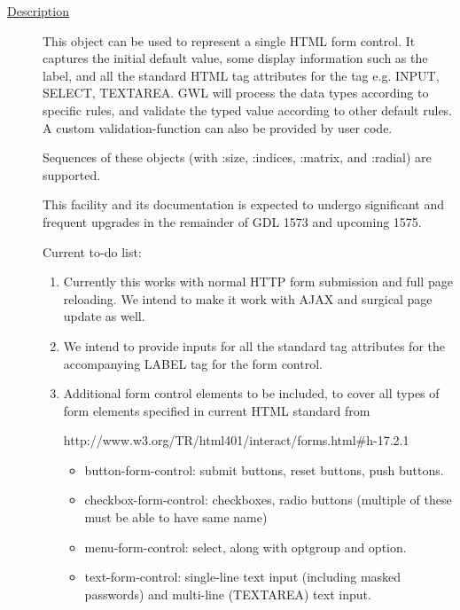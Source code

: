 \documentclass [11pt]{book}
\begin{document}
\begin{itemize}
\begin{description}
\item [
\underline{Description}]


This object can be used to represent a single HTML form control. It captures the 
initial default value, some display information such as the label, and all the standard HTML tag attributes
for the tag e.g. INPUT, SELECT, TEXTAREA. GWL will process the data types according to specific rules,
and validate the typed value according to other default rules. A custom validation-function can also 
be provided by user code. 

Sequences of these objects (with :size, :indices, :matrix, and :radial) are supported.

This facility and its documentation is expected to undergo significant and frequent upgrades in the remainder of GDL 1573 and upcoming 1575.

Current to-do list:



\begin{enumerate}

\item 
Currently this works with normal HTTP form submission and full page reloading. 
We intend to make it work with AJAX and surgical page update as well.



\item 
We intend to provide inputs for all the standard tag attributes for the accompanying LABEL tag for the form control.



\item 
Additional form control elements to be included, to cover all types of form elements specified in current HTML standard from

    http://www.w3.org/TR/html401/interact/forms.html\#h-17.2.1

    

\begin{itemize}

\item button-form-control: submit buttons, reset buttons, push buttons.
      

\item checkbox-form-control: checkboxes, radio buttons (multiple of these must be able to have same name)
      

\item menu-form-control: select, along with optgroup and option.
      

\item text-form-control: single-line text input (including masked passwords) and multi-line (TEXTAREA) text input.
      


\end{itemize}
\end{enumerate}
\end{description}
\end{itemize}
\end{document}
